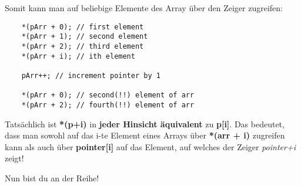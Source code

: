 \documentclass[
  accentcolor=tud1c,	%
  colorbacktitle,		%
  inverttitle,			%
  german,				%
  twoside
]{tudexercise}
\begin{document}
Somit kann man auf beliebige Elemente des Array über den Zeiger zugreifen:
\begin{lstlisting}
	*(pArr + 0); // first element
	*(pArr + 1); // second element
	*(pArr + 2); // third element
	*(pArr + i); // ith element
	
	pArr++; // increment pointer by 1
	
	*(pArr + 0); // second(!!) element of arr
	*(pArr + 2); // fourth(!!) element of arr
\end{lstlisting}

Tatsächlich ist \textbf{*(p+i)} in \textbf{jeder Hinsicht äquivalent} zu \textbf{p[i]}.
Das bedeutet, dass man sowohl auf das i-te Element eines Arrays über \textbf{*(arr + i)} zugreifen kann als auch über \textbf{pointer[i]} auf das Element, auf welches der Zeiger \emph{pointer+i} zeigt!

Nun bist du an der Reihe!
\end{document}
